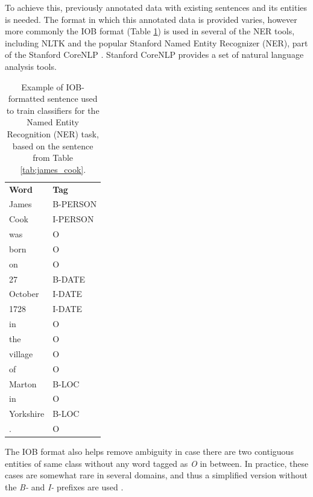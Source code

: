 \documentclass[11pt,a4paper,openright]{memoir}
\begin{document}
To achieve this, previously annotated data with existing sentences and its entities is needed. The format in which this annotated data is provided varies, however more commonly the IOB format (Table \ref{tab:james_cook_iob}) is used in several of the NER tools, including NLTK \cite{BirdKleinLoper09} and the popular Stanford Named Entity Recognizer (NER), part of the Stanford CoreNLP \cite{manning-EtAl:2014:P14-5}. Stanford CoreNLP provides a set of natural language analysis tools.

\begin{table}[!htbp]
  \centering
    \begin{tabular}{ll}
      \textbf{Word}          & \textbf{Tag} \\
      James                  & B-PERSON \\
      Cook                   & I-PERSON \\
      was                    & O \\
      born                   & O \\
      on                     & O \\
      27                     & B-DATE \\
      October                & I-DATE \\
      1728                   & I-DATE \\
      in                     & O \\
      the                    & O \\
      village                & O \\
      of                     & O \\
      Marton                 & B-LOC \\
      in                     & O \\
      Yorkshire              & B-LOC \\
      .                      & O \\
    \end{tabular}
  \caption[IOB-formatted sentence.]{Example of IOB-formatted sentence used to train classifiers for the Named Entity Recognition (NER) task, based on the sentence from Table \ref{tab:james_cook}.}
  \label{tab:james_cook_iob}
\end{table}

The IOB format also helps remove ambiguity in case there are two contiguous entities of same class without any word tagged as \emph{O} in between. In practice, these cases are somewhat rare in several domains, and thus a simplified version without the \emph{B-} and \emph{I-} prefixes are used \cite{Surdeanu:2011:CIE:2021153.2021155}.
\end{document}
